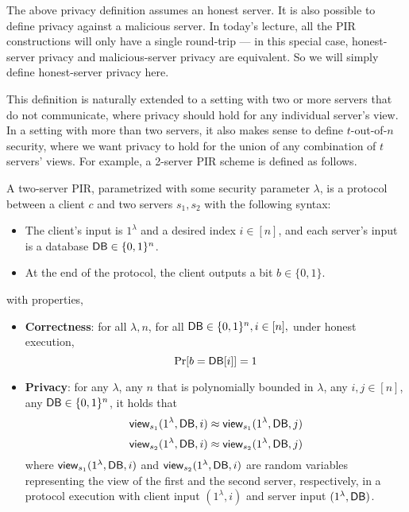 \begin{remark}
The above privacy definition assumes an honest server.
It is also possible to define privacy against a malicious server.
In today's lecture, all the PIR constructions
will only have a single round-trip --- 
in this special case, honest-server privacy
and malicious-server
privacy are equivalent. So we will simply define honest-server privacy here.
\end{remark}



This definition is naturally extended to 
a setting with two or more servers that do not communicate, 
where privacy should hold for any individual server's view. 
In a setting with more than two servers, it also makes
sense to define $t$-out-of-$n$ security, where
we want privacy to hold for 
the union of any combination of $t$ 
servers' views.
For example, a 2-server PIR scheme is defined as follows. 



\begin{definition}
A two-server PIR, parametrized with some security parameter $\lambda$, is a 
protocol between a client $c$ and two servers $s_{1},s_{2}$ 
with the following syntax:  
\begin{itemize}
	\item 
The client's input is $1^\lambda$ and a 
desired index $i \in [n]$, and 
each server's input is a database ${\sf DB} \in \{0,1\}^n$.
	\item At the end of the protocol, 
the client outputs a bit $b \in \{0,1\}$.
\end{itemize}
with properties,
\begin{itemize}
	\item \textbf{Correctness}: for all $\lambda, n$, for 
all ${\sf DB} \in \{0,1\}^n, i \in [n],$ under honest execution, 
	\[\Pr[b = \DB[i]] = 1%
\]
\item \textbf{Privacy}: 
for any $\lambda$, any $n$ that is polynomially bounded in $\lambda$,
any $i,j \in [n]$, any ${\sf DB}  \in \{0,1\}^n$, it holds that 
	\[{\sf view}_{s_{1}}(1^\lambda,{\sf DB},i) \approx {\sf view}_{s_{1}}(1^\lambda,{\sf DB},j)\]
	\[{\sf view}_{s_{2}}(1^\lambda,{\sf DB},i) \approx {\sf view}_{s_{2}}(1^\lambda,{\sf DB},j)\]
where ${\sf view}_{s_{1}}(1^\lambda, {\sf DB}, i)$
and ${\sf view}_{s_{2}}(1^\lambda, {\sf DB}, i)$
are random variables representing the 
view of the first and the second server, respectively, in a protocol
execution 
with client input $(1^\lambda, i)$
and server input $(1^\lambda, {\sf DB})$.
\end{itemize}
\end{definition}



